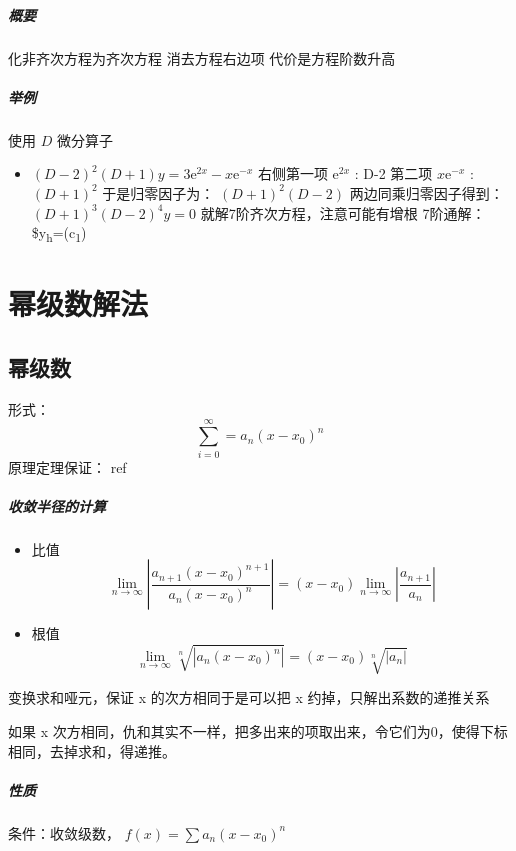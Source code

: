 \documentclass[11pt]{report}
\begin{document}
\paragraph{概要}
化非齐次方程为齐次方程
消去方程右边项
代价是方程阶数升高
\paragraph{举例}
使用 \(D\) 微分算子
\begin{itemize}
\item \((D-2)^2(D+1)y=3\mathrm{e}^{2x}-x\mathrm{e}^{-x}\)
右侧第一项 \(\mathrm{e}^{2x}\) : D-2
第二项 \(x\mathrm{e}^{-x}\) : \((D+1)^2\)
于是归零因子为： \((D+1)^2(D-2)\)
两边同乘归零因子得到： \((D+1)^3(D-2)^4y=0\)
就解7阶齐次方程，注意可能有增根
7阶通解： \$y\textsubscript{h}=(c\textsubscript{1})
\end{itemize}

\chapter{幂级数解法}
\label{sec:org591afbe}

\section{幂级数}
\label{sec:org99d5f04}
形式： $$\sum_{i=0}^{\infty}=a_n(x-x_0)^{n}$$
原理定理保证： ref
\paragraph{收敛半径的计算}
\begin{itemize}
\item 比值
\begin{equation}
\label{eq:3}
\lim_{n\rightarrow\infty}\left| \frac{a_{n+1}(x-x_0)^{n+1}}{a_n(x-x_0)^{n}} \right|=(x-x_0)\lim_{n\rightarrow\infty}\left| \frac{a_{n+1}}{a_n} \right|
\end{equation}
\item 根值
\begin{equation}
\label{eq:11}
\lim_{n\rightarrow\infty}\sqrt[n]{\left| a_n(x-x_0)^{n} \right|}=(x-x_0)\sqrt[n]{\left| a_n \right|}
\end{equation}
\end{itemize}

变换求和哑元，保证 x 的次方相同于是可以把 x 约掉，只解出系数的递推关系

如果 x 次方相同，仇和其实不一样，把多出来的项取出来，令它们为0，使得下标相同，去掉求和，得递推。
\paragraph{性质}
条件：收敛级数， \(f(x)=\sum a_n(x-x_0)^n\)
\end{document}

